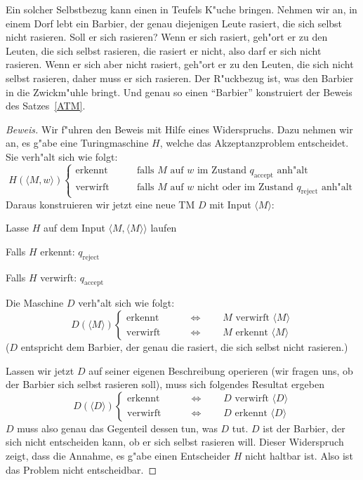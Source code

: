Ein solcher Selbstbezug kann einen in Teufels K"uche bringen.
Nehmen wir an, in einem Dorf lebt ein Barbier, der genau diejenigen
Leute rasiert, die sich selbst nicht rasieren.
Soll er sich rasieren?
Wenn er sich rasiert, geh"ort er zu den Leuten, die sich selbst rasieren,
die rasiert er nicht, also darf er sich nicht rasieren.
Wenn er sich
aber nicht rasiert, geh"ort er zu den Leuten, die sich nicht selbst
rasieren, daher muss er sich rasieren.
Der R"uckbezug ist, was den
Barbier in die Zwickm"uhle bringt.
Und genau so einen ``Barbier''
konstruiert der Beweis des Satzes~\ref{ATM}.

\begin{proof}[Beweis]
Wir f"uhren den Beweis mit Hilfe eines Widerspruchs.
Dazu nehmen wir
an, es g"abe eine Turingmaschine $H$, welche das Akzeptanzproblem entscheidet.
Sie verh"alt sich wie folgt:
\[
H(\langle M,w\rangle)\begin{cases}
\text{erkennt}&\qquad\text{falls $M$ auf $w$ im Zustand $q_{\text{accept}}$ anh"alt}
\\
\text{verwirft}&\qquad\text{falls $M$ auf $w$ nicht oder im Zustand $q_{\text{reject}}$ anh"alt}
\end{cases}
\]
Daraus konstruieren wir jetzt eine neue TM $D$ mit Input $\langle M\rangle$:
\medskip
\begin{compactenum}
\item Lasse $H$ auf dem Input $\langle M,\langle M\rangle\rangle$ laufen
\item Falls $H$ erkennt: $q_{\text{reject}}$
\item Falls $H$ verwirft: $q_{\text{accept}}$
\end{compactenum}
\medskip
Die Maschine $D$ verh"alt sich wie folgt:
\[
D(\langle M\rangle)\begin{cases}
\text{erkennt}&\qquad\Leftrightarrow\qquad \text{$M$ verwirft $\langle M\rangle$}
\\
\text{verwirft}&\qquad\Leftrightarrow\qquad \text{$M$ erkennt $\langle M\rangle$}
\end{cases}
\]
($D$ entspricht dem Barbier, der genau die rasiert, die sich selbst
nicht rasieren.)

Lassen wir jetzt $D$ auf seiner eigenen Beschreibung operieren
(wir fragen uns, ob der Barbier sich selbst rasieren soll), muss
sich folgendes Resultat ergeben
\[
D(\langle D\rangle)\begin{cases}
\text{erkennt}&\qquad\Leftrightarrow\qquad \text{$D$ verwirft $\langle D\rangle$}
\\
\text{verwirft}&\qquad\Leftrightarrow\qquad \text{$D$ erkennt $\langle D\rangle$}
\end{cases}
\]
$D$ muss also genau das Gegenteil dessen tun, was $D$ tut.
$D$ ist der Barbier, der sich nicht entscheiden kann, ob er sich selbst
rasieren will.
Dieser
Widerspruch zeigt, dass die Annahme, es g"abe einen Entscheider $H$
nicht haltbar ist.
Also ist das Problem nicht entscheidbar.
\end{proof}

